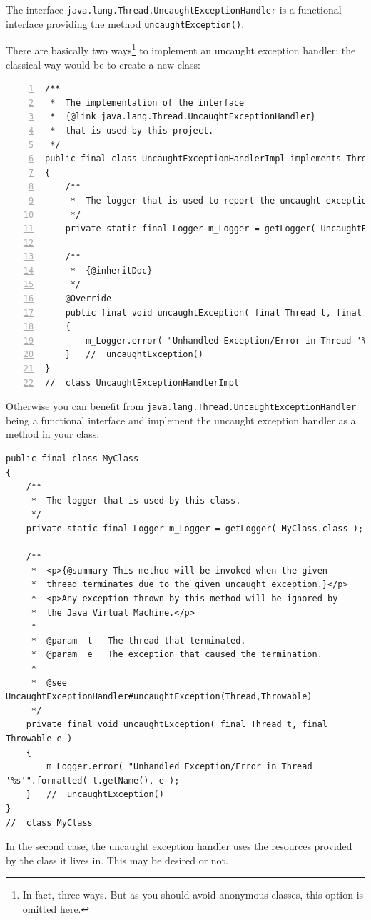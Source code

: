 \documentclass[11pt,a4paper, titlepage, parskip=half, headsepline, footsepline, cleardoublepage=current, headheight=1cm]{scrbook}
\begin{document}
The interface \lstinline|java.lang.Thread.UncaughtExceptionHandler| is a functional interface\autocite{ORACLE_DOC_LANGUAGE_SPECIFICATION:FunctionalInterfaces, ORACLE_DOC_LANGUAGE_SPECIFICATION:FunctionalInterface, ORACLE_DOC_FUNCTIONALINTERFACE_ANNOTATION} providing the method \lstinline|uncaughtException()|\autocite{ORACLE_DOC_UNCAUGHTEXCEPTIONHANDLER:uncaughtException}.

There are basically two ways\footnote{In fact, three ways. But as you should avoid anonymous classes, this option is omitted here.} to implement an uncaught exception handler; the classical way would be to create a new class:
\begin{lstlisting}[numbers=left,caption={Class UncaughtExceptionHandlerImpl}]
/**
 *  The implementation of the interface
 *  {@link java.lang.Thread.UncaughtExceptionHandler}
 *  that is used by this project.
 */
public final class UncaughtExceptionHandlerImpl implements Thread.UncaughtExceptionHandler
{
    /**
     *  The logger that is used to report the uncaught exceptions.
     */
    private static final Logger m_Logger = getLogger( UncaughtExceptionHandlerImpl.class );
     
    /**
     *  {@inheritDoc}
     */
    @Override
    public final void uncaughtException( final Thread t, final Throwable e )
    {
        m_Logger.error( "Unhandled Exception/Error in Thread '%s'".formatted( t.getName(), e );
    }   //  uncaughtException()
}
//  class UncaughtExceptionHandlerImpl 
\end{lstlisting}

Otherwise you can benefit from \lstinline|java.lang.Thread.UncaughtExceptionHandler| being a functional interface and implement the uncaught exception handler as a method in your class:
\begin{lstlisting}
public final class MyClass
{
    /**
     *  The logger that is used by this class.
     */
    private static final Logger m_Logger = getLogger( MyClass.class );
     
    /**
     *  <p>{@summary This method will be invoked when the given
     *  thread terminates due to the given uncaught exception.}</p>
     *  <p>Any exception thrown by this method will be ignored by
     *  the Java Virtual Machine.</p>
     *
     *  @param  t   The thread that terminated.
     *  @param  e   The exception that caused the termination.
     *     
     *  @see UncaughtExceptionHandler#uncaughtException(Thread,Throwable)
     */
    private final void uncaughtException( final Thread t, final Throwable e )
    {
        m_Logger.error( "Unhandled Exception/Error in Thread '%s'".formatted( t.getName(), e );
    }   //  uncaughtException()
}
//  class MyClass
\end{lstlisting}
In the second case, the uncaught exception handler uses the resources provided by the class it lives in. This may be desired or not.
\end{document}
